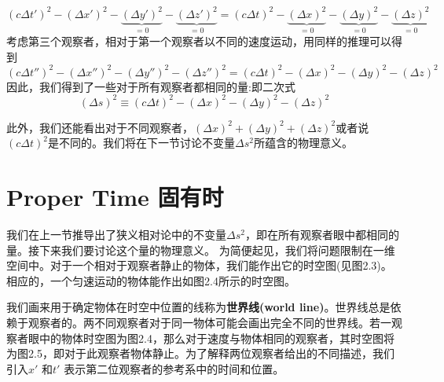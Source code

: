\begin{equation}\label{equ2.11}
\left( c \Delta t' \right)^2
-\left(\Delta x' \right)^2
-\underbrace{\left(\Delta y' \right)^2}_{=0}
-\underbrace{\left(\Delta z' \right)^2}_{=0}
=
\left( c \Delta t \right)^2
-\underbrace{\left(\Delta x \right)^2}_{=0}
-\underbrace{\left(\Delta y \right)^2}_{=0}
-\underbrace{\left(\Delta z \right)^2}_{=0}
\end{equation}
考虑第三个观察者，相对于第一个观察者以不同的速度运动，用同样的推理可以得到
\begin{equation}\label{equ2.12}
\left( c \Delta t'' \right)^2
-\left(\Delta x'' \right)^2
-\left(\Delta y'' \right)^2
-\left(\Delta z'' \right)^2
=
\left( c \Delta t \right)^2
-\left(\Delta x \right)^2
-\left(\Delta y \right)^2
-\left(\Delta z \right)^2
\end{equation}
因此，我们得到了一些对于所有观察者都相同的量:即二次式
\begin{equation}\label{equ2.13}
(\Delta s)^2
\equiv\left( c \Delta t \right)^2
-\left(\Delta x \right)^2
-\left(\Delta y \right)^2
-\left(\Delta z \right)^2
\end{equation}

此外，我们还能看出对于不同观察者，$(\Delta x)^2+(\Delta y)^2+(\Delta z)^2$或者说$(c\Delta t)^2$是不同的。我们将在下一节讨论不变量$\Delta s^2$所蕴含的物理意义。


\section[固有时]{Proper Time \quad 固有时}
\label{sec2.2}
我们在上一节推导出了狭义相对论中的不变量$\Delta s^2$，即在所有观察者眼中都相同的量。接下来我们要讨论这个量的物理意义。
为简便起见，我们将问题限制在一维空间中。对于一个相对于观察者静止的物体，我们能作出它的时空图(见图2.3)。相应的，一个匀速运动的物体能作出如图2.4所示的时空图。

我们画来用于确定物体在时空中位置的线称为{\bf{世界线(world line)}}。世界线总是依赖于观察者的。两不同观察者对于同一物体可能会画出完全不同的世界线。若一观察者眼中的物体时空图为图2.4，那么对于速度与物体相同的观察者，其时空图将为图2.5，即对于此观察者物体静止。为了解释两位观察者给出的不同描述，我们引入$x'$ 和$t'$ 表示第二位观察者的参考系中的时间和位置。

